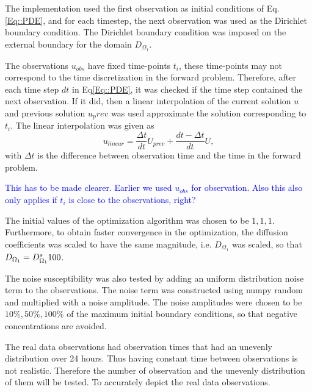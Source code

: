 \documentclass[11pt,a4paper]{article}
\newcommand{\kam}[1]{\textcolor{blue}{#1}}
\begin{document}
The implementation used the first observation as initial conditions of Eq.\ref{Eq::PDE}, and for each timestep, the next observation was used as the Dirichlet boundary condition. The Dirichlet boundary condition was imposed on the external boundary for the domain $D_{\Omega_1}$. 

The observations $u_{obs}$ have fixed time-points $t_i$, these time-points may not correspond to the time discretization in the forward problem. Therefore, after each time step $dt$ in Eq\ref{Eq::PDE}, it was checked if the time step contained the next observation. If it did, then a linear interpolation of the current solution $u$ and previous solution $u_prev$ was used approximate the solution corresponding to $t_i$. The linear interpolation was given as  
\begin{equation}
u_{linear} = \frac{\Delta t}{dt} U_{prev} + \frac{dt - \Delta t }{dt} U,
\end{equation}
with $\Delta t$ is the difference between observation time and the time in the forward problem.


 \kam{This has to be made clearer. Earlier we used $u_{obs}$ for observation. Also this also only applies if $t_i$ is close to the observations, right?} 
 
 
 
The initial values of the optimization algorithm was chosen to be $1,1,1$. Furthermore, to obtain faster convergence in the optimization, the diffusion coefficients was scaled to have the same magnitude, i.e.  $D_{\Omega_1}$ was scaled, so that $D_{\Omega_1} = D\sp {s}_{\Omega_1}100$.     


The noise susceptibility was also tested by adding an uniform distribution noise term to the observations. The noise term was constructed using numpy random and multiplied with a noise amplitude. The noise amplitudes were chosen to be $ 10\%, 50\%, 100\%$ of the maximum initial boundary conditions, so that negative concentrations are avoided.  

The real data observations had observation times that had an unevenly distribution over 24 hours. Thus having  constant time between observations is not realistic. Therefore the number of observation and the unevenly distribution of them will be tested. To accurately depict the real data observations. 
\end{document}
